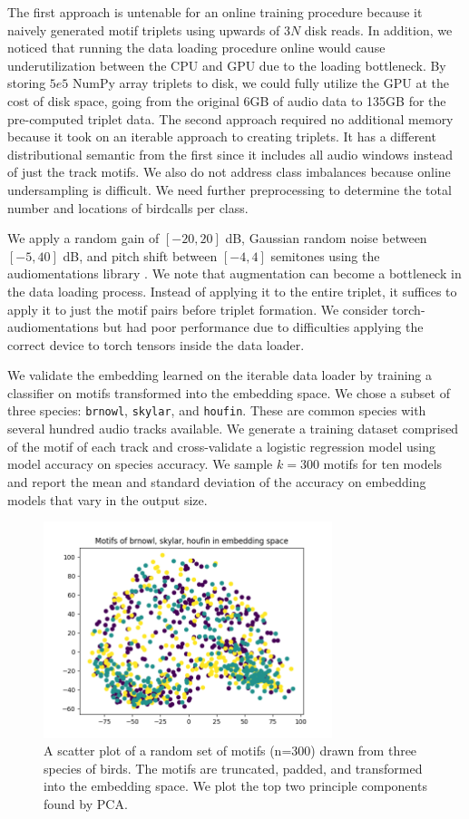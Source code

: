 \documentclass[
]{ceurart}
\begin{document}
The first approach is untenable for an online training procedure because it naively generated motif triplets using upwards of $3N$ disk reads. In addition, we noticed that running the data loading procedure online would cause underutilization between the CPU and GPU due to the loading bottleneck. By storing $5e5$ NumPy array triplets to disk, we could fully utilize the GPU at the cost of disk space, going from the original 6GB of audio data to 135GB for the pre-computed triplet data. The second approach required no additional memory because it took on an iterable approach to creating triplets. It has a different distributional semantic from the first since it includes all audio windows instead of just the track motifs. We also do not address class imbalances because online undersampling is difficult. We need further preprocessing to determine the total number and locations of birdcalls per class.

We apply a random gain of $[-20, 20]$ dB, Gaussian random noise between $[-5, 40]$ dB, and pitch shift between $[-4, 4]$ semitones using the audiomentations library \cite{audiomentations}. We note that augmentation can become a bottleneck in the data loading process. Instead of applying it to the entire triplet, it suffices to apply it to just the motif pairs before triplet formation. We consider torch-audiomentations but had poor performance due to difficulties applying the correct device to torch tensors inside the data loader.

We validate the embedding learned on the iterable data loader by training a classifier on motifs transformed into the embedding space. We chose a subset of three species: \texttt{brnowl}, \texttt{skylar}, and \texttt{houfin}. These are common species with several hundred audio tracks available. We generate a training dataset comprised of the motif of each track and cross-validate a logistic regression model using model accuracy on species accuracy. We sample $k=300$ motifs for ten models and report the mean and standard deviation of the accuracy on embedding models that vary in the output size.

\begin{figure}[h]
    \centering
    \includegraphics[width=0.75\textwidth]{figures/interclass.png}
    \caption{A scatter plot of a random set of motifs (n=300) drawn from three species of birds. The motifs are truncated, padded, and transformed into the embedding space. We plot the top two principle components found by PCA. }
    \label{fig:my_label}
\end{figure}
\end{document}

